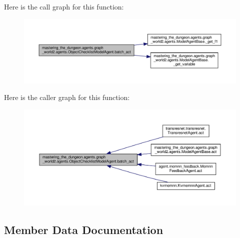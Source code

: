 Here is the call graph for this function\+:
\nopagebreak
\begin{figure}[H]
\begin{center}
\leavevmode
\includegraphics[width=350pt]{classmastering__the__dungeon_1_1agents_1_1graph__world2_1_1agents_1_1ObjectChecklistModelAgent_a63f393cbab394c68f64437b2a280a8bf_cgraph}
\end{center}
\end{figure}
Here is the caller graph for this function\+:
\nopagebreak
\begin{figure}[H]
\begin{center}
\leavevmode
\includegraphics[width=350pt]{classmastering__the__dungeon_1_1agents_1_1graph__world2_1_1agents_1_1ObjectChecklistModelAgent_a63f393cbab394c68f64437b2a280a8bf_icgraph}
\end{center}
\end{figure}


\subsection{Member Data Documentation}
\mbox{\label{classmastering__the__dungeon_1_1agents_1_1graph__world2_1_1agents_1_1ObjectChecklistModelAgent_a1386b1bf65f5b7a710d8ca13cfa7fafb}} 
